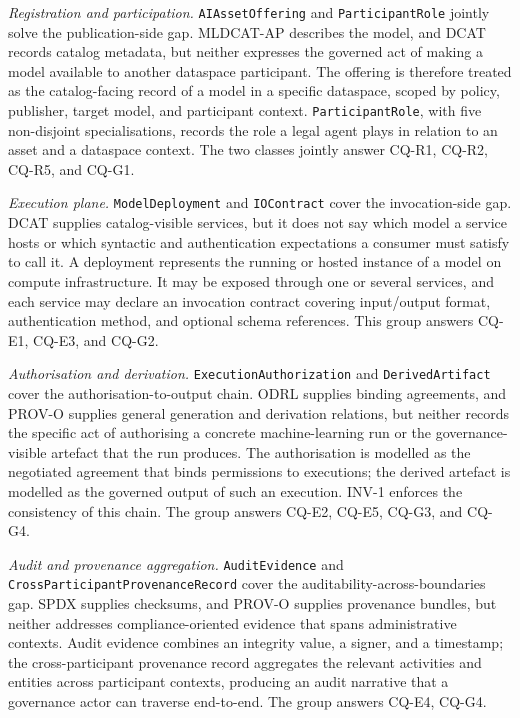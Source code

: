 \documentclass[Afour,sagev,times]{sagej}
\newcommand{\code}[1]{\texttt{#1}}
\begin{document}
\medskip\noindent\emph{Registration and participation.}
\code{AIAssetOffering} and \code{ParticipantRole} jointly solve the publication-side gap. MLDCAT-AP describes the model, and DCAT records catalog metadata, but neither expresses the governed act of making a model available to another dataspace participant. The offering is therefore treated as the catalog-facing record of a model in a specific dataspace, scoped by policy, publisher, target model, and participant context. \code{ParticipantRole}, with five non-disjoint specialisations, records the role a legal agent plays in relation to an asset and a dataspace context. The two classes jointly answer CQ-R1, CQ-R2, CQ-R5, and CQ-G1.

\medskip\noindent\emph{Execution plane.}
\code{ModelDeployment} and \code{IOContract} cover the invocation-side gap. DCAT supplies catalog-visible services, but it does not say which model a service hosts or which syntactic and authentication expectations a consumer must satisfy to call it. A deployment represents the running or hosted instance of a model on compute infrastructure. It may be exposed through one or several services, and each service may declare an invocation contract covering input/output format, authentication method, and optional schema references. This group answers CQ-E1, CQ-E3, and CQ-G2.

\medskip\noindent\emph{Authorisation and derivation.}
\code{ExecutionAuthorization} and \code{DerivedArtifact} cover the authorisation-to-output chain. ODRL supplies binding agreements, and PROV-O supplies general generation and derivation relations, but neither records the specific act of authorising a concrete machine-learning run or the governance-visible artefact that the run produces. The authorisation is modelled as the negotiated agreement that binds permissions to executions; the derived artefact is modelled as the governed output of such an execution. INV-1 enforces the consistency of this chain. The group answers CQ-E2, CQ-E5, CQ-G3, and CQ-G4.

\medskip\noindent\emph{Audit and provenance aggregation.}
\code{AuditEvidence} and \code{CrossParticipantProvenanceRecord} cover the auditability-across-boundaries gap. SPDX supplies checksums, and PROV-O supplies provenance bundles, but neither addresses compliance-oriented evidence that spans administrative contexts. Audit evidence combines an integrity value, a signer, and a timestamp; the cross-participant provenance record aggregates the relevant activities and entities across participant contexts, producing an audit narrative that a governance actor can traverse end-to-end. The group answers CQ-E4, CQ-G4.
\end{document}
